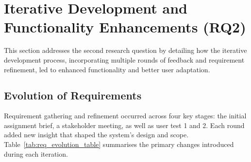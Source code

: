 \section{Iterative Development and Functionality Enhancements (RQ2)}
This section addresses the second research question by detailing how the iterative development process, incorporating multiple rounds of feedback and requirement refinement, led to enhanced functionality and better user adaptation.

\subsection{Evolution of Requirements}
Requirement gathering and refinement occurred across four key stages: the initial assignment brief, a stakeholder meeting, as well as user test 1 and 2. Each round added new insight that shaped the system's design and scope. Table~\ref{tab:req_evolution_table} summarises the primary changes introduced during each iteration.

\begin{table}[H]
\centering
\renewcommand{\arraystretch}{1.3}
\caption{Key changes in system requirements across development phases}
\label{tab:req_evolution_table}
\end{table}

